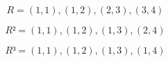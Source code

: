 \documentclass{article}
\begin{document}
\begin{equation}
R = {(1,1),(1,2),(2,3),(3,4)}
\end{equation}

\begin{equation}
R² = {(1,1),(1,2),(1,3),(2,4)}
\end{equation}

\begin{equation}
R³ = {(1,1),(1,2),(1,3),(1,4)}
\end{equation}
\end{document}
